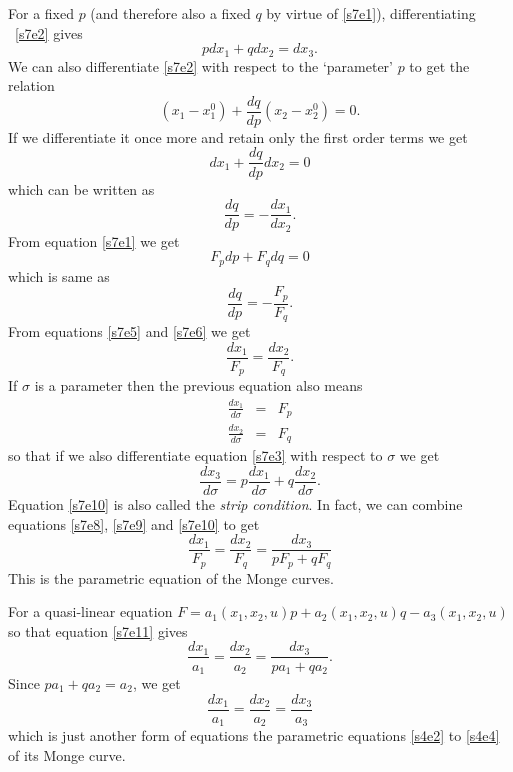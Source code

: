 \documentclass{article}
\newcommand{\td}[2]{\frac{d{#1}}{d{#2}}}
\theoremstyle{plain}
\numberwithin{thm}{section}
\theoremstyle{plain}
\numberwithin{prop}{section}
\theoremstyle{definition}
\numberwithin{defn}{section}
\theoremstyle{remark}
\numberwithin{equation}{section}
\begin{document}
For a fixed $p$ (and therefore also a fixed $q$ by virtue of \eqref{s7e1}), differentiating \
\eqref{s7e2} gives
\begin{equation}\label{s7e3}
pdx_1 + qdx_2 = dx_3.
\end{equation}
We can also differentiate \eqref{s7e2} with respect to the `parameter' $p$ to get the relation
\[
(x_1 - x_1^0) + \td{q}{p}(x_2 - x_2^0) = 0.
\]
If we differentiate it once more and retain only the first order terms we get
\begin{equation}\label{s7e4}
dx_1 + \td{q}{p}dx_2 = 0
\end{equation}
which can be written as 
\begin{equation}\label{s7e5}
\td{q}{p} = -\frac{dx_1}{dx_2}.
\end{equation}
From equation \eqref{s7e1} we get
\[
F_{p}dp + F_{q}dq = 0
\]
which is same as
\begin{equation}\label{s7e6}
\td{q}{p} = -\frac{F_{p}}{F_{q}}.
\end{equation}
From equations \eqref{s7e5} and \eqref{s7e6} we get
\begin{equation}\label{s7e7}
\frac{dx_1}{F_{p}} = \frac{dx_2}{F_{q}}.
\end{equation}
If $\sigma$ is a parameter then the previous equation also means
\begin{eqnarray}
\td{x_1}{\sigma} &=& F_{p} \label{s7e8} \\
\td{x_2}{\sigma} &=& F_{q} \label{s7e9}
\end{eqnarray}
so that if we also differentiate equation \eqref{s7e3} with respect to $\sigma$ we get
\begin{equation}\label{s7e10}
\td{x_3}{\sigma} = p\td{x_1}{\sigma} + q\td{x_2}{\sigma}.
\end{equation}
Equation \eqref{s7e10} is also called the \emph{strip condition}. In fact, we can combine equations 
\eqref{s7e8}, \eqref{s7e9} and \eqref{s7e10} to get
\begin{equation}\label{s7e11}
\frac{dx_1}{F_{p}} = \frac{dx_2}{F_{q}} = \frac{dx_3}{pF_{p} + qF_{q}}
\end{equation}
This is the parametric equation of the Monge curves. 

For a quasi-linear equation $F = a_1(x_1, x_2, u)p + a_2(x_1, x_2, u)q - a_3(x_1, x_2, u)$ so that 
equation \eqref{s7e11} gives
\[
\frac{dx_1}{a_1} = \frac{dx_2}{a_2} = \frac{dx_3}{pa_1 + qa_2}.
\]
Since $pa_1 + qa_2 = a_2$, we get
\[
\frac{dx_1}{a_1} = \frac{dx_2}{a_2} = \frac{dx_3}{a_3}
\]
which is just another form of equations the parametric equations \eqref{s4e2} to \eqref{s4e4} of its
Monge curve. 
\end{document}
